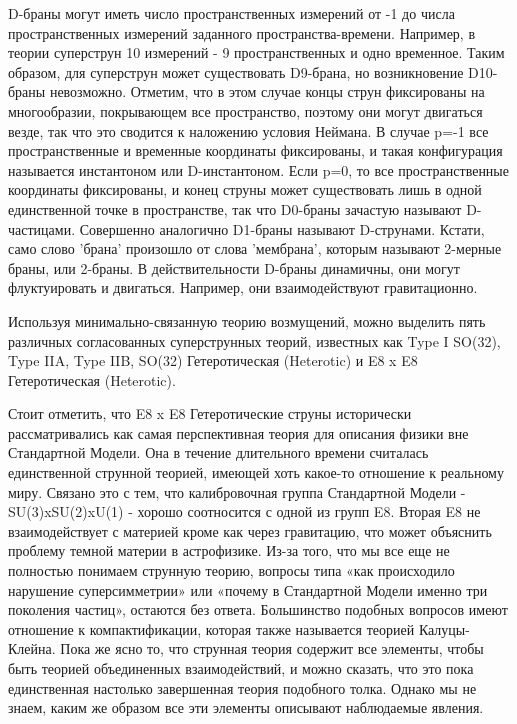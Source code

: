 D-браны могут иметь число пространственных измерений от -1 до числа пространственных измерений заданного пространства-времени. Например, в теории суперструн 10 измерений - 9 пространственных и одно временное. Таким образом, для суперструн может существовать D9-брана, но возникновение D10-браны невозможно. Отметим, что в этом случае концы струн фиксированы на многообразии, покрывающем все пространство, поэтому они могут двигаться везде, так что это сводится к наложению условия Неймана. В случае p=-1 все пространственные и временные координаты фиксированы, и такая конфигурация называется инстантоном или D-инстантоном. Если p=0, то все пространственные координаты фиксированы, и конец струны может существовать лишь в одной единственной точке в пространстве, так что D0-браны зачастую называют D-частицами. Совершенно аналогично D1-браны называют D-струнами. Кстати, само слово 'брана' произошло от слова 'мембрана', которым называют 2-мерные браны, или 2-браны. В действительности D-браны динамичны, они могут флуктуировать и двигаться. Например, они взаимодействуют гравитационно.

Используя минимально-связанную теорию возмущений, можно выделить пять различных согласованных суперструнных теорий, известных как Type I SO(32), Type IIA, Type IIB, SO(32) Гетеротическая (Heterotic) и E8 x E8 Гетеротическая (Heterotic).





Стоит отметить, что E8 x E8 Гетеротические струны исторически рассматривались как самая перспективная теория для описания физики вне Стандартной Модели. Она в течение длительного времени считалась единственной струнной теорией, имеющей хоть какое-то отношение к реальному миру. Связано это с тем, что калибровочная группа Стандартной Модели - SU(3)xSU(2)xU(1) - хорошо соотносится с одной из групп E8. Вторая E8 не взаимодействует с материей кроме как через гравитацию, что может объяснить проблему темной материи в астрофизике. Из-за того, что мы все еще не полностью понимаем струнную теорию, вопросы типа «как происходило нарушение суперсимметрии» или «почему в Стандартной Модели именно три поколения частиц», остаются без ответа. Большинство подобных вопросов имеют отношение к компактификации, которая также называется теорией Калуцы-Клейна. Пока же ясно то, что струнная теория содержит все элементы, чтобы быть теорией объединенных взаимодействий, и можно сказать, что это пока единственная настолько завершенная теория подобного толка. Однако мы не знаем, каким же образом все эти элементы описывают наблюдаемые явления. 

